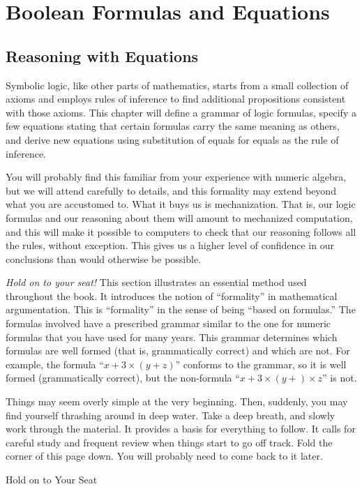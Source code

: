 \chapter{Boolean Formulas and Equations}
\label{ch:Boolean-Formulas}

\section{Reasoning with Equations}
\label{sec:math-and-equations}
Symbolic logic, like other parts of mathematics, starts from a small
collection of axioms and employs rules of inference to find
additional propositions consistent with those axioms. This
chapter will define a grammar of logic formulas, specify a few
equations stating that certain formulas carry the same meaning as others,
and derive new equations
using substitution of equals for equals as the rule of
inference.

You will probably find this familiar from your
experience with numeric algebra, but we will attend carefully
to details, and this formality may extend beyond what you are
accustomed to. What it buys us is mechanization. That is, our
logic formulas and our reasoning about them will amount to
mechanized computation, and this will make it possible to
computers to check that our reasoning follows all the rules,
without exception. This gives us a higher level of confidence
in our conclusions than would otherwise be possible.

\begin{aside}
\emph{Hold on to your seat!} This section illustrates an essential method used throughout the book. It introduces the notion of ``formality'' in mathematical argumentation. This is ``formality'' in the sense of being ``based on formulas.'' The formulas involved have a prescribed grammar similar to the one for numeric formulas that you have used for many years. This grammar determines which formulas are well formed (that is, grammatically correct) and which are not.
For example, the formula ``$x+3\times(y + z)$'' conforms to the grammar, so it is well formed (grammatically correct),
but the non-formula ``$x+3\times(y + ) \times z$'' is not.

Things may seem overly simple at the very beginning.
Then, suddenly, you may find yourself thrashing around in deep water.
Take a deep breath, and slowly work  through the material.
It provides a basis for everything to follow.
It calls for careful study and frequent review when things start to go off track.
Fold the corner of this page down. You will probably need to come back to it later.
\caption{Hold on to Your Seat}
\label{aside-hold-on-to-seat}
\end{aside}

